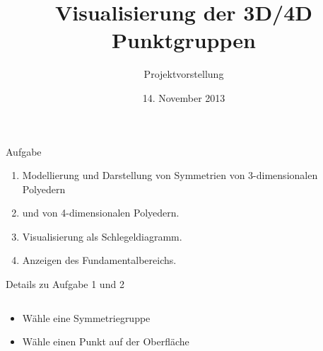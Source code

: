 \documentclass[ucs,11pt]{beamer}
\title[Punktgruppen]{Visualisierung der 3D/4D Punktgruppen}
\subtitle{Projektvorstellung}
\institute[FU Berlin]{Freie Universität Berlin}
\date[14.11.2013]{14. November 2013}
\begin{document}
\begin{frame}[plain]
	\titlepage
\end{frame}

\begin{frame}{Aufgabe}
	\begin{enumerate}
		\item Modellierung und Darstellung von Symmetrien von 3-dimensionalen Polyedern \pause
		\item und von 4-dimensionalen Polyedern. \pause
		\item Visualisierung als Schlegeldiagramm. \pause
		\item Anzeigen des Fundamentalbereichs.
	\end{enumerate}
\end{frame}


\begin{frame}{Details zu Aufgabe 1 und 2}

\begin{columns}
\begin{column}{.48\textwidth}
\begin{itemize}
	\item Wähle eine Symmetriegruppe
	\item Wähle einen Punkt auf der Oberfläche
	\end{itemize}


\end{column}
\end{columns}
\end{frame}
\end{document}

